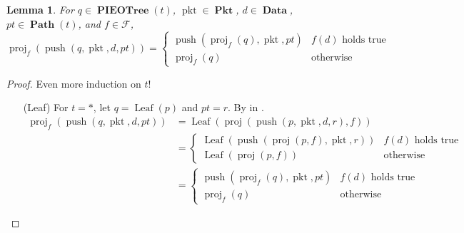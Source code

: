 \documentclass{amsart}
\DeclareMathOperator{\pkt}{\mathrm{pkt}}
\DeclareMathOperator{\push}{\mathrm{push}}
\DeclareMathOperator{\proj}{\mathrm{proj}}
\DeclareMathOperator{\Pkt}{\mathbf{Pkt}}
\DeclareMathOperator{\Data}{\mathbf{Data}}
\DeclareMathOperator{\Path}{\mathbf{Path}}
\DeclareMathOperator{\PIEOTree}{\mathbf{PIEOTree}}
\DeclareMathOperator{\Leaf}{\mathrm{Leaf}}
\newtheorem{lem}[thm]{Lemma}
\theoremstyle{definition}
\begin{document}
\begin{lem}
    \label{lem:push}
    For $q \in \PIEOTree(t)$, $\pkt \in \Pkt$, $d \in \Data$, $pt \in \Path(t)$, and $f \in \mathcal F$,
    $$
        \proj_f(\push(q, \pkt, d, pt)) = 
        \begin{cases}
            \push(\proj_f(q), \pkt, pt) & f(d) \text{ holds true}\\
            \proj_f(q) & \text{otherwise}
        \end{cases}
    $$
\end{lem}

\begin{proof}
    Even more induction on $t$!
    \begin{itemize}
        \item[(Leaf)] For $t = \ast$, let $q = \Leaf(p)$ and $pt = r$.
            By  in .
            \begin{align*}
                \proj_f(\push(q, \pkt, d, pt)) &= \Leaf(\proj(\push(p, \pkt, d, r), f)) \\
                                              &=
                \begin{cases}
                    \Leaf(\push(\proj(p, f), \pkt, r)) & f(d) \text{ holds true}\\
                    \Leaf(\proj(p, f)) & \text{otherwise}
                \end{cases}\\
                                              &= 
                \begin{cases}
                    \push(\proj_f(q), \pkt, pt) & f(d) \text{ holds true}\\
                    \proj_f(q) & \text{otherwise}
                \end{cases}
            \end{align*}


\end{itemize}
\end{proof}
\end{document}
